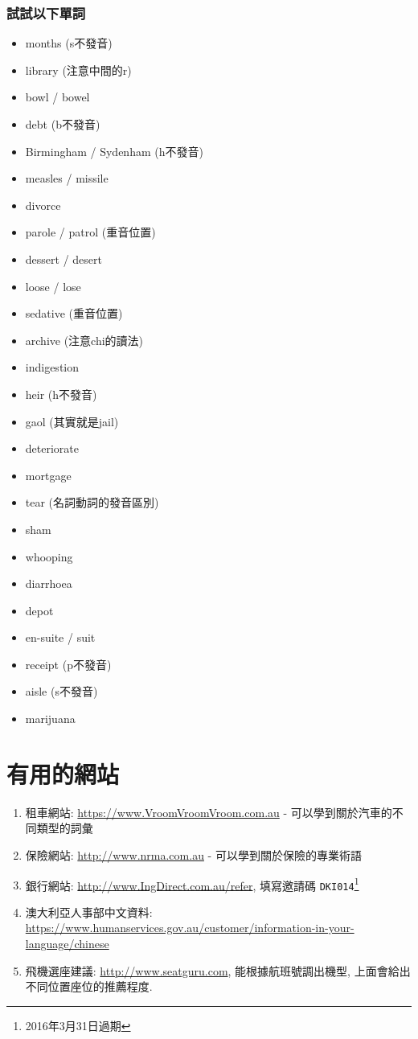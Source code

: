 \subsubsection{試試以下單詞}
\begin{multicols}{3}
\begin{itemize}
  \itemsep0em
  \item months (s不發音)
  \item library (注意中間的r)
  \item bowl / bowel
  \item debt (b不發音)
  \item Birmingham / Sydenham (h不發音)
  \item measles / missile
  \item divorce
  \item parole / patrol (重音位置)
  \item dessert / desert
  \item loose / lose
  \item sedative (重音位置)
  \item archive (注意chi的讀法)
  \item indigestion
  \item heir (h不發音)
  \item gaol (其實就是jail)
  \item deteriorate
  \item mortgage
  \item tear (名詞動詞的發音區別)
  \item sham
  \item whooping
  \item diarrhoea
  \item depot
  \item en-suite / suit
  \item receipt (p不發音)
  \item aisle (s不發音)
  \item marijuana
\end{itemize}
\end{multicols}
\newpage

\section{有用的網站}
\begin{enumerate}
  \itemsep0em
  \item 租車網站: \url{https://www.VroomVroomVroom.com.au} - 可以學到關於汽車的不同類型的詞彙
  \item 保險網站: \url{http://www.nrma.com.au} - 可以學到關於保險的專業術語
  \item 銀行網站: \url{http://www.IngDirect.com.au/refer}, 填寫邀請碼 \texttt{DKI014}\footnote{2016年3月31日過期}
  \item 澳大利亞人事部中文資料: \url{https://www.humanservices.gov.au/customer/information-in-your-language/chinese}
  \item 飛機選座建議: \url{http://www.seatguru.com}, 能根據航班號調出機型, 上面會給出不同位置座位的推薦程度.
\end{enumerate}


